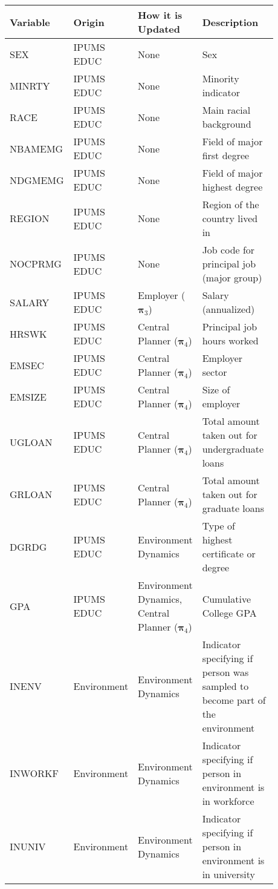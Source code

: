 \begin{table*}[ht!]
\caption{Education MAFE Features}
\label{tab::Education_indicators}
\centering
\begin{tabular}{ p{0.20\linewidth} || p{0.15\linewidth} || p{0.20\linewidth} || p{0.33\linewidth}}
 \hline
 Variable & Origin & How it is Updated & Description\\
 \hline
 SEX & IPUMS EDUC& None& Sex\\ 
 \hline
 MINRTY & IPUMS EDUC& None& Minority indicator\\ 
 \hline
 RACE & IPUMS EDUC& None& Main racial background\\  
 \hline
  NBAMEMG & IPUMS EDUC& None& Field of major first degree\\
 \hline
 NDGMEMG & IPUMS EDUC& None& Field of major highest degree\\
 \hline
 REGION & IPUMS EDUC& None & Region of the country lived in\\
 \hline
 NOCPRMG & IPUMS EDUC& None & Job code for principal job (major group)\\
 \hline
 SALARY & IPUMS EDUC& Employer ($\boldsymbol{\pi}_3$)& Salary (annualized) \\ 
 \hline
 HRSWK & IPUMS EDUC& Central Planner ($\boldsymbol{\pi}_4$) & Principal job hours worked\\
\hline
  EMSEC & IPUMS EDUC& Central Planner ($\boldsymbol{\pi}_4$) & Employer sector\\
 \hline
 EMSIZE & IPUMS EDUC& Central Planner ($\boldsymbol{\pi}_4$) & Size of employer\\
 \hline
 UGLOAN & IPUMS EDUC& Central Planner ($\boldsymbol{\pi}_4$) & Total amount taken out for undergraduate loans\\
 \hline
 GRLOAN & IPUMS EDUC& Central Planner ($\boldsymbol{\pi}_4$) & Total amount taken out for graduate loans\\
 \hline
  DGRDG & IPUMS EDUC& Environment Dynamics & Type of highest certificate or degree\\ 
 \hline
  GPA & IPUMS EDUC& Environment Dynamics, Central Planner ($\boldsymbol{\pi}_4$)& Cumulative College GPA \\ 
\hline
 INENV & Environment & Environment Dynamics & Indicator specifying if person was sampled to become part of the environment\\
 \hline
 INWORKF & Environment & Environment Dynamics & Indicator specifying if person in environment is in workforce\\
 \hline
 INUNIV & Environment & Environment Dynamics & Indicator specifying if person in environment is in university\\

\end{tabular}
\end{table*}
